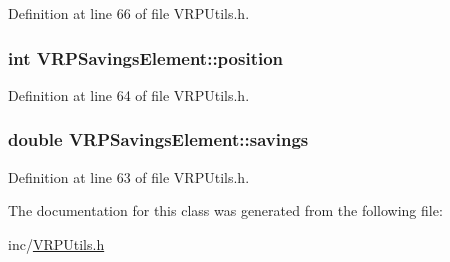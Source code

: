 Definition at line 66 of file VRPUtils.h.

\hypertarget{class_v_r_p_savings_element_a66c3d14231c356805a718cabb71ed768}{
\subsubsection[{position}]{\setlength{\rightskip}{0pt plus 5cm}int {\bf VRPSavingsElement::position}}}
\label{class_v_r_p_savings_element_a66c3d14231c356805a718cabb71ed768}


Definition at line 64 of file VRPUtils.h.

\hypertarget{class_v_r_p_savings_element_aa66efafd0412c0554a02e4f66dc445a7}{
\subsubsection[{savings}]{\setlength{\rightskip}{0pt plus 5cm}double {\bf VRPSavingsElement::savings}}}
\label{class_v_r_p_savings_element_aa66efafd0412c0554a02e4f66dc445a7}


Definition at line 63 of file VRPUtils.h.



The documentation for this class was generated from the following file:\begin{DoxyCompactItemize}
\item 
inc/\hyperlink{_v_r_p_utils_8h}{VRPUtils.h}\end{DoxyCompactItemize}
